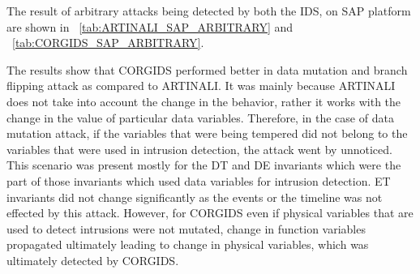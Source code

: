 The result of arbitrary attacks being detected by both the \ac{IDS}, on \ac{SAP} platform are shown in ~\autoref{tab:ARTINALI_SAP_ARBITRARY} and ~\autoref{tab:CORGIDS_SAP_ARBITRARY}.

\begin{table}
\centering
  \caption{Results of intrusion detection by ARTINALI for Arbitrary attacks on \ac{SAP} platform}
  \label{tab:ARTINALI_SAP_ARBITRARY}
\end{table}


\begin{table}
\centering
  \caption{Results of intrusion detection by \ac{CORGIDS} for Arbitrary attacks on \ac{SAP} platform}
  \label{tab:CORGIDS_SAP_ARBITRARY}
\end{table}

The results show that \ac{CORGIDS} performed better in data mutation and branch flipping attack as compared to ARTINALI. It was mainly because ARTINALI does not take into account the change in the behavior, rather it works with the change in the value of particular data variables. Therefore, in the case of data mutation attack, if the variables that were being tempered did not belong to the variables that were used in intrusion detection, the attack went by unnoticed. This scenario was present mostly for the D\textbar T and D\textbar E invariants which were the part of those invariants which used data variables for intrusion detection. E\textbar T invariants did not change significantly as the events or the timeline was not effected by this attack. However, for \ac{CORGIDS} even if physical variables that are used to detect intrusions were not mutated, change in function variables propagated ultimately leading to change in physical variables, which was ultimately detected by \ac{CORGIDS}.

